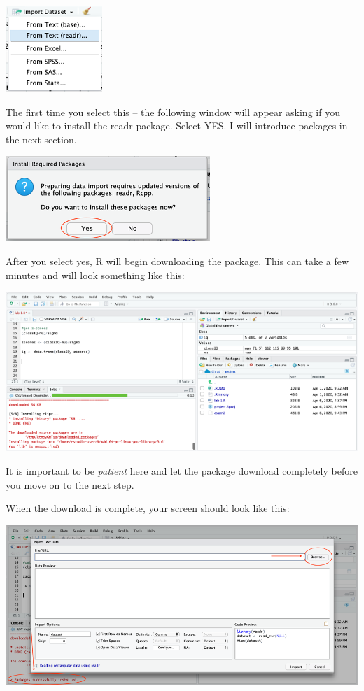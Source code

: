 \documentclass[
]{book}
\begin{document}
\includegraphics{img/readrbox.png}

The first time you select this -- the following window will appear asking if you would like to install the readr package. Select YES. I will introduce packages in the next section.

\includegraphics{img/installreadrbox.png}

After you select yes, R will begin downloading the package. This can take a few minutes and will look something like this:

\includegraphics{img/installreadr.png}

It is important to be \emph{patient} here and let the package download completely before you move on to the next step.

When the download is complete, your screen should look like this:

\includegraphics{img/importwindow.png}
\end{document}
